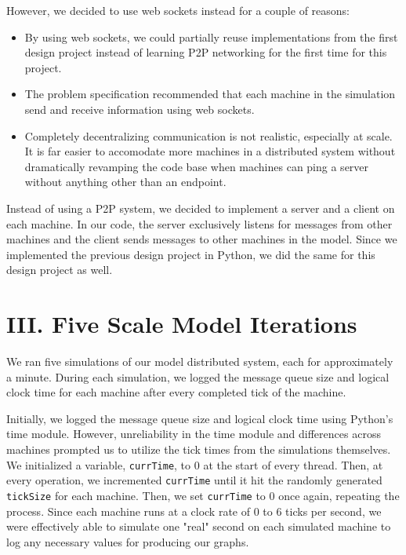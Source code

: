 \documentclass[
	a4paper, %
	10pt, %
	unnumberedsections, %
	twoside, %
]{LTJournalArticle}
\begin{document}
However, we decided to use web sockets instead for a couple of reasons: 
\begin{itemize}
    \item By using web sockets, we could partially reuse implementations from the first design project instead of learning P2P networking for the first time for this project. 
    \item The problem specification recommended that each machine in the simulation send and receive information using web sockets. 
    \item Completely decentralizing communication is not realistic, especially at scale. It is far easier to accomodate more machines in a distributed system without dramatically revamping the code base when machines can ping a server without anything other than an endpoint. 
\end{itemize}

Instead of using a P2P system, we decided to implement a server and a client on each machine. In our code, the server exclusively listens for messages from other machines and the client sends messages to other machines in the model. Since we implemented the previous design project in Python, we did the same for this design project as well. 

\section{III. Five Scale Model Iterations}

We ran five simulations of our model distributed system, each for approximately a minute. During each simulation, we logged the message queue size and logical clock time for each machine after every completed tick of the machine. 
    
Initially, we logged the message queue size and logical clock time using Python's time module. However, unreliability in the time module and differences across machines prompted us to utilize the tick times from the simulations themselves. We initialized a variable, \texttt{currTime}, to 0 at the start of every thread. Then, at every operation, we incremented \texttt{currTime} until it hit the randomly generated \texttt{tickSize} for each machine. Then, we set \texttt{currTime} to 0 once again, repeating the process. Since each machine runs at a clock rate of 0 to 6 ticks per second, we were effectively able to simulate one "real" second on each simulated machine to log any necessary values for producing our graphs. 
\end{document}
